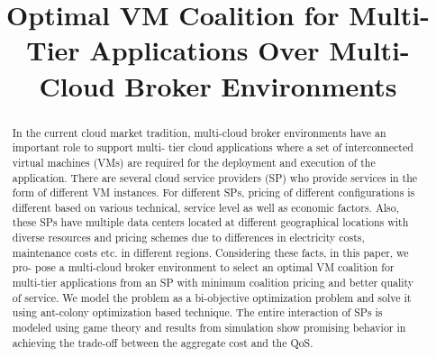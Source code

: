 \documentclass[conference]{IEEEtran}
\begin{document}
\title{Optimal VM Coalition for Multi-Tier Applications
	Over Multi-Cloud Broker Environments\\

{\footnotesize \textsuperscript{}}
}

\author{
\and
{}
\and
{}
\and
{}
}

\maketitle
\pagestyle{plain} 

\begin{abstract}
In the current cloud market tradition, multi-cloud
broker environments have an important role to support multi-
tier cloud applications where a set of interconnected virtual
machines (VMs) are required for the deployment and execution
of the application. There are several cloud service providers (SP)
who provide services in the form of different VM instances. For
different SPs, pricing of different configurations is different based
on various technical, service level as well as economic factors.
Also, these SPs have multiple data centers located at different
geographical locations with diverse resources and pricing schemes
due to differences in electricity costs, maintenance costs etc. in
different regions. Considering these facts, in this paper, we pro-
pose a multi-cloud broker environment to select an optimal VM
coalition for multi-tier applications from an SP with minimum
coalition pricing and better quality of service. We model the
problem as a bi-objective optimization problem and solve it using
ant-colony optimization based technique. The entire interaction
of SPs is modeled using game theory and results from simulation
show promising behavior in achieving the trade-off between the
aggregate cost and the QoS.
\end{abstract}
\end{document}
